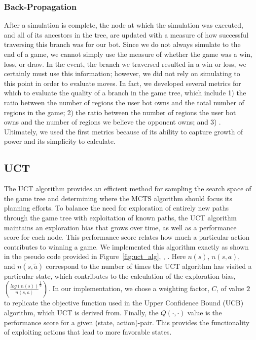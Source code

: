 \documentclass[a4paper,11pt]{article}
\begin{document}
\subsubsection{Back-Propagation}
After a simulation is complete, the node at which the simulation was executed, and all of its 
ancestors in the tree, are updated with a measure of how successful traversing this branch was 
for our bot. Since we do not always simulate to the end of a game, we cannot simply use the measure
of whether the game was a win, loss, or draw.  In the event, the branch we traversed resulted in a win
or loss, we certainly must use this information; however, we did not rely on simulating to this point
in order to evaluate moves. In fact, we developed several metrics for which to evaluate
the quality of a branch in the game tree, which include 1) the ratio between the number of regions
the user bot owns and the total number of regions in the game; 2) the ratio between the number of 
regions the user bot owns  and the number of regions we believe the opponent owns; and 
3) . 
Ultimately, we used the first metrics because of its ability to capture growth of power and 
its simplicity to calculate.  


\subsection{UCT}\label{sec:uct}
The UCT algorithm provides an efficient method for sampling the search space of the game tree and 
determining where the MCTS algorithm should focus its planning efforts. To balance the need for 
exploration of entirely new paths through the game tree with exploitation of known paths, the UCT 
algorithm maintains an exploration bias that grows over time, as well as a performance score for each node. 
This performance score relates how much a particular action contributes to winning a game.
We implemented this algorithm exactly as shown in the pseudo code provided in Figure~\ref{fig:uct_alg}, 
\cite{Nau2015}, \cite{NauLecture}. Here $n(s)$, $n(s,a)$, and $n(s,\tilde{a})$ correspond to the number of 
times the UCT algorithm has visited a particular state, which contributes to the calculation of the 
exploration bias, $(\frac{log(n(s))}{n(s,a)}^{\frac{1}{2}})$. In our implementation, we chose a weighting 
factor, $C$, of value $2$ to replicate the objective function used in the Upper Confidence Bound (UCB) 
algorithm, which UCT is derived from. Finally, the $Q(\cdot, \cdot)$ value is the performance score for
a given (state, action)-pair.  This provides the functionality of exploiting actions that lead to more 
favorable states.
\end{document}
